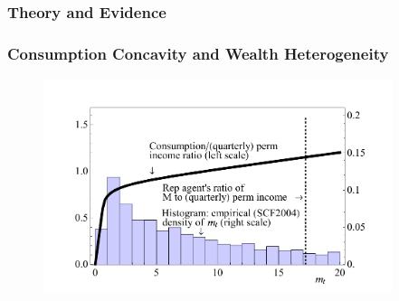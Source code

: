 \documentclass{beamer}
\begin{document}





\subsubsection{Theory and Evidence}
\begin{frame}[label=cFuncAndW]
\frametitle{Consumption Concavity and Wealth Heterogeneity}
\begin{figure}
\centering
\includegraphics[width=\textwidth,height=6.3cm]{../Figures/CFuncPointAndHistNetWorthRepLinePlot.pdf}
\end{figure}
\end{frame}
\end{document}
